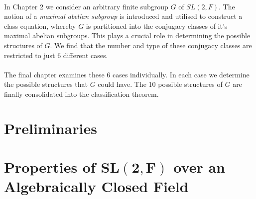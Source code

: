 \documentclass[a4paper , 11pt]{book}
\theoremstyle{definition}
\theoremstyle{remark}
\begin{document}
\vspace{-0.2mm}
\\
In Chapter 2 we consider an arbitrary finite subgroup $G$ of $SL(2,F)$. The notion of a \textit{maximal abelian subgroup} is introduced and utilised to construct a class equation, whereby $G$ is partitioned into the conjugacy classes of it's maximal abelian subgroups. This plays a crucial role in determining the possible structures of $G$. We find that the number and type of these conjugacy classes are restricted to just 6 different cases. \\
\vspace{-0.2mm}
\\
The final chapter examines these 6 cases individually. In each case we determine the possible structures that $G$ could have. The 10 possible structures of $G$ are finally consolidated into the classification theorem.


\newpage\phantom{blabla}
\thispagestyle{plain}

\chapter[Preliminaries]{Preliminaries}


\chapter[Properties of $\pmb{SL(2,F)}$ over an Algebraically Closed Field]{Properties of $\pmb{SL(2,F)}$ over an Algebraically Closed Field}


\end{document}
